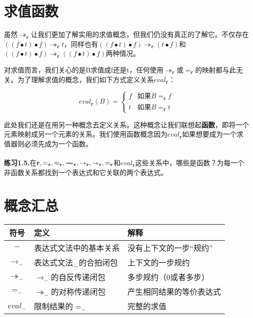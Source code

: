 \documentclass{book}
\def\figoo{\rightsquigarrow\kern-8pt\rightsquigarrow}
\def\r{\mathbf{r}}
\def\lianxi{\noindent \makebox[0pt][r]{$\rhd$} \textbf}
\begin{document}
\section{求值函数}
虽然$\twoheadrightarrow_\r $让我们更加了解实用的求值概念，但我们仍没有真正的了解它。不仅存在$((f\bullet t)\bullet f)\twoheadrightarrow_\r t$，同样也有$((f\bullet t)\bullet f)\twoheadrightarrow_\r (t\bullet f)$和$((f\bullet t)\bullet f)\twoheadrightarrow_\r ((f\bullet t)\bullet f)$两种情况。\par
对求值而言，我们关心的是B求值成f还是t，任何使用$\twoheadrightarrow_\r $或$=_\r $的映射都与此无关。为了理解求值的概念，我们如下方式定义关系$eval_\r $：
\begin{framed}
$$
eval_\r (B)=
\left\{
\begin{array}{ll}
f & \text{如果$B=_\r f$} \\
t & \text{如果$B=_\r t$}
\end{array}
\right.
$$
\end{framed}
此处我们还是在用另一种概念去定义关系。这种概念让我们联想起\textbf{函数}，即将一个元素映射成另一个元素的关系。我们使用函数概念因为$eval_\r $如果想要成为一个求值器则必须先成为一个函数。\\\\
\lianxi{练习1.5.}在$\r,\asymp_\r,\approx_\r,\figoo_\r,\rightarrow_\r,\twoheadrightarrow_\r,=_\r$和$eval_\r$这些关系中，哪些是函数？为每一个非函数关系都找到一个表达式和它关联的两个表达式。
\section{概念汇总}

\begin{tabular}{|cll|}
  \hline
  \textbf{符号} & \textbf{定义} & \textbf{解释}\\
  \hline
  $-$ & 表达式文法中的基本关系 & 没有上下文的一步“规约” \\
  \hline
  $\rightarrow_-$ & 表达式文法\_的合拍闭包 & 上下文的一步规约 \\
  \hline
  $\twoheadrightarrow_-$ & $\rightarrow_-$的自反传递闭包 & 多步规约（0或者多步） \\
  \hline
  $=_-$ & $\twoheadrightarrow_-$的对称传递闭包 & 产生相同结果的等价表达式 \\
  \hline
  $eval_-$ & 限制结果的$=_-$ & 完整的求值 \\
  \hline
\end{tabular}
\end{document}
